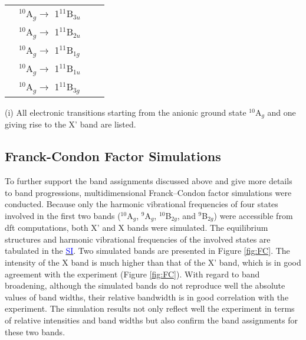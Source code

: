 \begin{refsection}
\begin{table}[htbp!]
\begin{threeparttable}
\begin{tabular}{@{}llll@{}}
	 & $^{10}$A$_g \longrightarrow$ 1$^{11}$B$_{3u}$ &               			                 &               \\
	 & $^{10}$A$_g \longrightarrow$ 1$^{11}$B$_{2u}$ &               				             &               \\
	 & $^{10}$A$_g \longrightarrow$ 1$^{11}$B$_{1g}$ &               				             &               \\
	 & $^{10}$A$_g \longrightarrow$ 1$^{11}$B$_{1u}$ &               				             &               \\
	 & $^{10}$A$_g \longrightarrow$ 1$^{11}$B$_{3g}$ &               				             &               \\ \bottomrule
	\end{tabular}
	\begin{tablenotes}
		\item[(i)] All electronic transitions starting from the anionic ground state $^{10}$A$_g$ and one giving rise to the X' band are listed.
	\end{tablenotes}
\end{threeparttable}
\end{table}

\FloatBarrier

\subsection{Franck-Condon Factor Simulations}


To further support the band assignments discussed above and give more details to band progressions, multidimensional Franck–Condon factor simulations were conducted. Because only the harmonic vibrational frequencies of four states involved in the first two bands ($^{10}$A$_g$, $^9$A$_g$, $^{10}$B$_{2g}$, and $^{9}$B$_{2g}$) were accessible from \acrshort{dft} computations, both X' and X bands were simulated. The equilibrium structures and harmonic vibrational frequencies of the involved states are tabulated in the \href{https://pubs.acs.org/doi/suppl/10.1021/acs.jctc.8b00412/suppl_file/ct8b00412_si_001.pdf}{\textcolor{blue}{SI}}. Two simulated bands are presented in Figure \ref{fig:FC}. The intensity of the X band is much higher than that of the X' band, which is in good agreement with the experiment (Figure \ref{fig:FC}). With regard to band broadening, although the simulated bands do not reproduce well the absolute values of band widths, their relative bandwidth is in good correlation with the experiment. The simulation results not only reflect well the experiment in terms of relative intensities and band widths but also confirm the band assignments for these two bands. 


\end{refsection}
